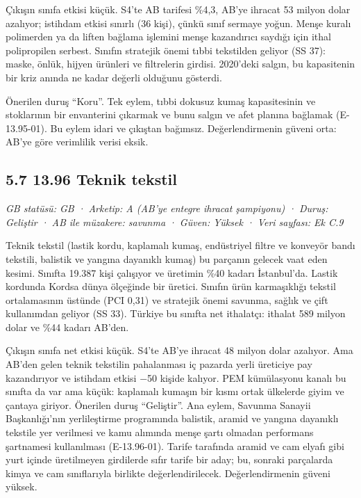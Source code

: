 Çıkışın sınıfa etkisi küçük. S4'te AB tarifesi \%4,3, AB'ye ihracat 53 milyon dolar azalıyor; istihdam etkisi sınırlı (36 kişi), çünkü sınıf sermaye yoğun. Menşe kuralı polimerden ya da liften bağlama işlemini menşe kazandırıcı saydığı için ithal polipropilen serbest. Sınıfın stratejik önemi tıbbi tekstilden geliyor (SS 37): maske, önlük, hijyen ürünleri ve filtrelerin girdisi. 2020'deki salgın, bu kapasitenin bir kriz anında ne kadar değerli olduğunu gösterdi.

Önerilen duruş ``Koru''. Tek eylem, tıbbi dokusuz kumaş kapasitesinin ve stoklarının bir envanterini çıkarmak ve bunu salgın ve afet planına bağlamak (E-13.95-01). Bu eylem idari ve çıkıştan bağımsız. Değerlendirmenin güveni orta: AB'ye göre verimlilik verisi eksik.

\hypertarget{nace_kartlar_13-15-57-1396-teknik-tekstil}{%
\subsection{5.7 13.96 Teknik tekstil}\label{nace_kartlar_13-15-57-1396-teknik-tekstil}}

\emph{GB statüsü: GB · Arketip: A (AB'ye entegre ihracat şampiyonu) · Duruş: Geliştir · AB ile müzakere: savunma · Güven: Yüksek · Veri sayfası: Ek C.9}

Teknik tekstil (lastik kordu, kaplamalı kumaş, endüstriyel filtre ve konveyör bandı tekstili, balistik ve yangına dayanıklı kumaş) bu parçanın gelecek vaat eden kesimi. Sınıfta 19.387 kişi çalışıyor ve üretimin \%40 kadarı İstanbul'da. Lastik kordunda Kordsa dünya ölçeğinde bir üretici. Sınıfın ürün karmaşıklığı tekstil ortalamasının üstünde (PCI 0,31) ve stratejik önemi savunma, sağlık ve çift kullanımdan geliyor (SS 33). Türkiye bu sınıfta net ithalatçı: ithalat 589 milyon dolar ve \%44 kadarı AB'den.

Çıkışın sınıfa net etkisi küçük. S4'te AB'ye ihracat 48 milyon dolar azalıyor. Ama AB'den gelen teknik tekstilin pahalanması iç pazarda yerli üreticiye pay kazandırıyor ve istihdam etkisi −50 kişide kalıyor. PEM kümülasyonu kanalı bu sınıfta da var ama küçük: kaplamalı kumaşın bir kısmı ortak ülkelerde giyim ve çantaya giriyor. Önerilen duruş ``Geliştir''. Ana eylem, Savunma Sanayii Başkanlığı'nın yerlileştirme programında balistik, aramid ve yangına dayanıklı tekstile yer verilmesi ve kamu alımında menşe şartı olmadan performans şartnamesi kullanılması (E-13.96-01). Tarife tarafında aramid ve cam elyafı gibi yurt içinde üretilmeyen girdilerde sıfır tarife bir aday; bu, sonraki parçalarda kimya ve cam sınıflarıyla birlikte değerlendirilecek. Değerlendirmenin güveni yüksek.

